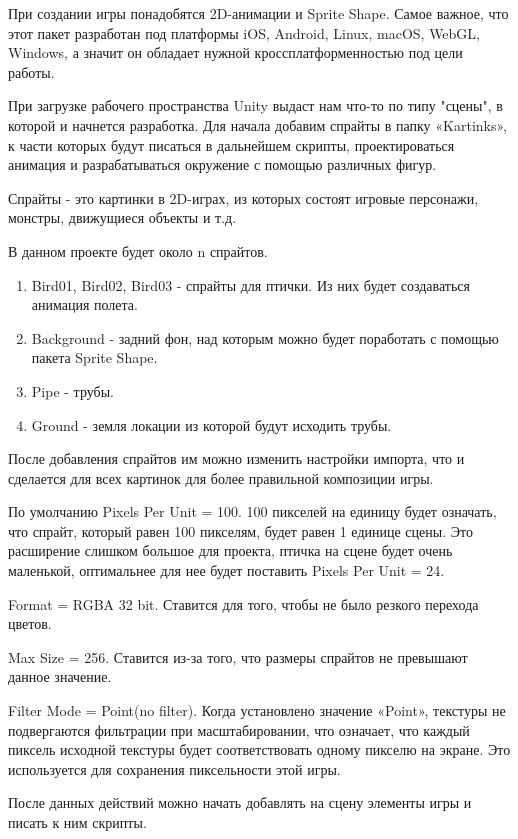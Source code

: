 \documentclass[14pt, oneside]{altsu-report}
\begin{document}
При создании игры понадобятся 2D-анимации и  Sprite Shape. Самое важное, что этот пакет разработан под платформы iOS, Android, Linux, macOS, WebGL, Windows, а значит он обладает нужной кроссплатформенностью под цели работы.

При загрузке рабочего пространства Unity выдаст нам что-то по типу "сцены", в которой и начнется разработка. Для начала добавим спрайты в папку «Kartinks», к части которых будут писаться в дальнейшем скрипты, проектироваться анимация и разрабатываться окружение с помощью различных фигур.

Спрайты - это картинки в 2D-играх, из которых состоят игровые персонажи, монстры, движущиеся объекты и т.д.

В данном проекте будет около n спрайтов. 

\begin{enumerate}
\item Bird01, Bird02, Bird03 - спрайты для птички. Из них будет создаваться анимация полета.
\item Background - задний фон, над которым можно будет поработать с помощью пакета Sprite Shape.
\item Pipe - трубы.
\item Ground - земля локации из которой будут исходить трубы.
\end{enumerate} 

После добавления спрайтов им можно изменить настройки импорта, что и сделается для всех картинок для более правильной композиции игры.

По умолчанию Pixels Per Unit = 100. 100 пикселей на единицу будет означать, что спрайт, который равен 100 пикселям, будет равен 1 единице сцены. Это расширение слишком большое для проекта, птичка на сцене будет очень маленькой, оптимальнее для нее будет поставить Pixels Per Unit = 24.

Format = RGBA 32 bit. Ставится для того, чтобы не было резкого перехода цветов.

Max Size = 256. Ставится из-за того, что размеры спрайтов не превышают данное значение.

Filter Mode = Point(no filter). Когда установлено значение «Point», текстуры не подвергаются фильтрации при масштабировании, что означает, что каждый пиксель исходной текстуры будет соответствовать одному пикселю на экране. Это используется для сохранения пиксельности этой игры.

После данных действий можно начать добавлять на сцену элементы игры и писать к ним скрипты.
\end{document}
